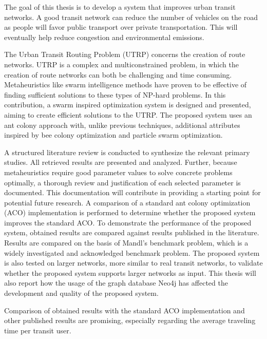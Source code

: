 

The goal of this thesis is to develop a system that improves urban transit networks. A good transit network can reduce the number of vehicles on the road as people will favor public transport over private transportation. This will eventually help reduce congestion and environmental emissions.%

The Urban Transit Routing Problem (UTRP) concerns the creation of route networks. UTRP is a complex and multiconstrained problem, in which the creation of route networks can both be challenging and time consuming. Metaheuristics like swarm intelligence methods have proven to be effective of finding sufficient solutions to these types of NP-hard problems. In this contribution, a swarm inspired optimization system is designed and presented, aiming to create efficient solutions to the UTRP. The proposed system uses an ant colony approach with, unlike previous techniques, additional attributes inspired by bee colony optimization and particle swarm optimization. 

A structured literature review is conducted to synthesize the relevant primary studies. All retrieved results are presented and analyzed. Further, because metaheuristics require good parameter values to solve concrete problems optimally, a thorough review and justification of each selected parameter is documented. This documentation will contribute in providing a starting point for potential future research. A comparison of a standard ant colony optimization (ACO) implementation is performed to determine whether the proposed system improves the standard ACO. To demonstrate the performance of the proposed system, obtained results are compared against results published in the literature. Results are compared on the basis of Mandl's benchmark problem, which is a widely investigated and acknowledged benchmark problem. The proposed system is also tested on larger networks, more similar to real transit networks, to validate whether the proposed system supports larger networks as input. This thesis will also report how the usage of the graph database Neo4j has affected the development and quality of the proposed system.  

Comparison of obtained results with the standard ACO implementation and other published results are promising, especially regarding the average traveling time per transit user. 



